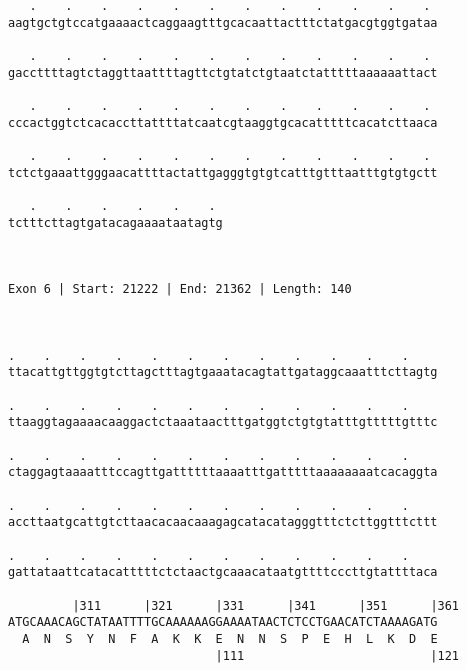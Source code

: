 \documentclass{article}
\begin{document}
\begin{Verbatim}
   .    .    .    .    .    .    .    .    .    .    .    . 
aagtgctgtccatgaaaactcaggaagtttgcacaattactttctatgacgtggtgataa
                                                            
   .    .    .    .    .    .    .    .    .    .    .    . 
gaccttttagtctaggttaattttagttctgtatctgtaatctatttttaaaaaattact
                                                            
   .    .    .    .    .    .    .    .    .    .    .    . 
cccactggtctcacaccttattttatcaatcgtaaggtgcacatttttcacatcttaaca
                                                            
   .    .    .    .    .    .    .    .    .    .    .    . 
tctctgaaattgggaacattttactattgagggtgtgtcatttgtttaatttgtgtgctt
                                                            
   .    .    .    .    .    . 
tctttcttagtgatacagaaaataatagtg
                              
                              
 
Exon 6 | Start: 21222 | End: 21362 | Length: 140



.    .    .    .    .    .    .    .    .    .    .    .    
ttacattgttggtgtcttagctttagtgaaatacagtattgataggcaaatttcttagtg
                                                            
.    .    .    .    .    .    .    .    .    .    .    .    
ttaaggtagaaaacaaggactctaaataactttgatggtctgtgtatttgtttttgtttc
                                                            
.    .    .    .    .    .    .    .    .    .    .    .    
ctaggagtaaaatttccagttgattttttaaaatttgatttttaaaaaaaatcacaggta
                                                            
.    .    .    .    .    .    .    .    .    .    .    .    
accttaatgcattgtcttaacacaacaaagagcatacatagggtttctcttggtttcttt
                                                            
.    .    .    .    .    .    .    .    .    .    .    .    
gattataattcatacatttttctctaactgcaaacataatgttttcccttgtattttaca
                                                            
         |311      |321      |331      |341      |351      |361
ATGCAAACAGCTATAATTTTGCAAAAAAGGAAAATAACTCTCCTGAACATCTAAAAGATG
  A  N  S  Y  N  F  A  K  K  E  N  N  S  P  E  H  L  K  D  E
                             |111                          |121
  

\end{Verbatim}
\end{document}
